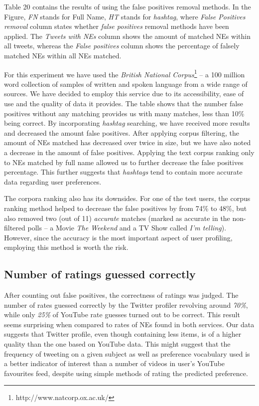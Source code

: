 Table 20 contains the results of using the false positives removal methods. In the Figure,
\textit{FN} stands for Full Name, \textit{HT} stands for \textit{hashtag}, where \textit{False Positives removal}
column states whether \textit{false positives} removal methods have been applied.
The \textit{Tweets with NEs} column shows the amount of matched NEs within all tweets, whereas
the \textit{False positives} column shows the percentage of falsely matched
NEs within all NEs matched.

For this experiment we have used the \textit{British National Corpus}\footnote{http://www.natcorp.ox.ac.uk/} --
a 100 million word collection of samples of written and spoken language from a wide range of sources. We have
decided to employ this service due to its accessibility, ease of use and the quality of data it provides.
The table shows that the number false positives without any matching provides us with many matches, less than
10\% being correct. By incorporating \textit{hashtag} searching, we have received more results and decreased the amount
false positives. After applying corpus filtering, the amount of NEs matched has decreased over twice in size,
but we have also noted a decrease in the amount of false positives. Applying the text corpus ranking only to
NEs matched by full name allowed us to further decrease the false positives percentage.
This further suggests that \textit{hashtags} tend to contain more accurate data regarding user preferences.

The corpora ranking also has its downsides. For one of the test users, the corpus ranking method helped to
decrease the false positives by from 74\% to 48\%, but also removed two (out of 11) \textit{accurate} matches (marked as
accurate in the non-filtered polls -- a Movie \textit{The Weekend} and a TV Show called \textit{I'm telling}).
However, since the accuracy is the most important aspect of user profiling, employing this method is worth
the risk.

\subsection{Number of ratings guessed correctly}
\label{sec:evaluation_ratings_correct}
After counting out false positives, the correctness of ratings was judged. The
number of rates guessed correctly by the Twitter profiler revolving around \textit{70\%},
while only \textit{25\%} of YouTube rate guesses turned out to be correct. This
result seems surprising when compared to rates of NEs found in both
services. Our data suggests that Twitter profile, even though containing less
items, is of a higher quality than the one based on YouTube data.  This
might suggest that the frequency of tweeting on a given subject as well as
preference vocabulary used is a better indicator of interest than a number of
videos in user's YouTube favourites feed, despite using simple methods of rating
the predicted preference.

